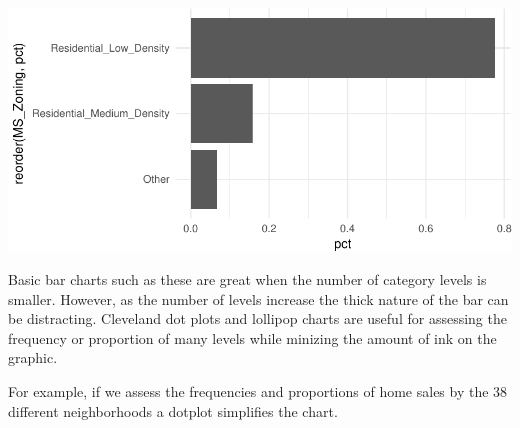 \documentclass[]{article}
\newenvironment{Shaded}{\begin{snugshade}}{\end{snugshade}}
\newcommand{\KeywordTok}[1]{\textcolor[rgb]{0.13,0.29,0.53}{\textbf{#1}}}
\newcommand{\DataTypeTok}[1]{\textcolor[rgb]{0.13,0.29,0.53}{#1}}
\newcommand{\StringTok}[1]{\textcolor[rgb]{0.31,0.60,0.02}{#1}}
\newcommand{\OperatorTok}[1]{\textcolor[rgb]{0.81,0.36,0.00}{\textbf{#1}}}
\newcommand{\NormalTok}[1]{#1}
\begin{document}
\begin{center}\includegraphics{Chapter_3_-_Visualization_files/figure-latex/bar3-1} \end{center}

Basic bar charts such as these are great when the number of category
levels is smaller. However, as the number of levels increase the thick
nature of the bar can be distracting. Cleveland dot plots and lollipop
charts are useful for assessing the frequency or proportion of many
levels while minizing the amount of ink on the graphic.

For example, if we assess the frequencies and proportions of home sales
by the 38 different neighborhoods a dotplot simplifies the chart.

\begin{Shaded}
\end{Shaded}
\end{document}
